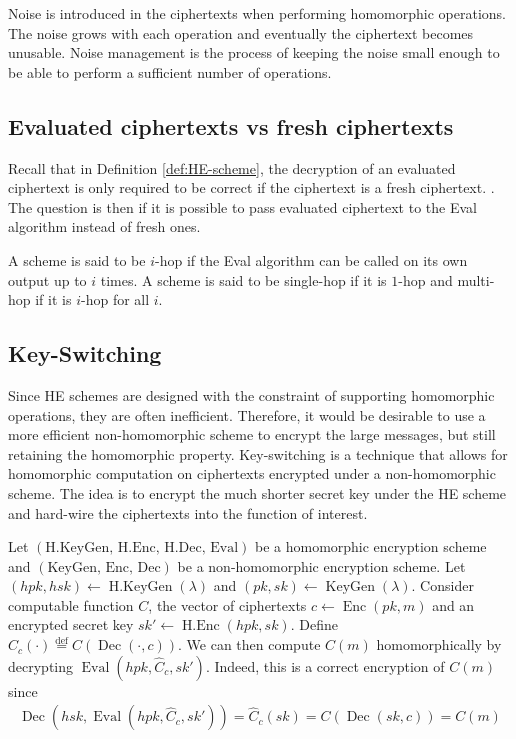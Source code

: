 Noise is introduced in the ciphertexts when performing homomorphic operations. The noise grows with each operation and eventually the ciphertext becomes unusable. Noise management is the process of keeping the noise small enough to be able to perform a sufficient number of operations.

\subsection*{Evaluated ciphertexts vs fresh ciphertexts}
Recall that in Definition \ref{def:HE-scheme}, the decryption of an evaluated ciphertext is only required to be correct if the ciphertext is a fresh ciphertext. . The question is then if it is possible to pass evaluated ciphertext to the Eval algorithm instead of fresh ones.

A scheme is said to be $i$-hop if the Eval algorithm can be called on its own output up to $i$ times. A scheme is said to be single-hop if it is $1$-hop and multi-hop if it is $i$-hop for all $i$. 

\subsection*{Key-Switching}
Since HE schemes are designed with the constraint of supporting homomorphic operations, they are often inefficient. Therefore, it would be desirable to use a more efficient non-homomorphic scheme to encrypt the large messages, but still retaining the homomorphic property. Key-switching is a technique that allows for homomorphic computation on ciphertexts encrypted under a non-homomorphic scheme. The idea is to encrypt the much shorter secret key under the HE scheme and hard-wire the ciphertexts into the function of interest.

Let $(\text{H.KeyGen, H.Enc, H.Dec, Eval})$ be a homomorphic encryption scheme and $(\text{KeyGen, Enc, Dec})$ be a non-homomorphic encryption scheme. Let $(hpk,hsk) \leftarrow \operatorname{H.KeyGen}(\lambda)$ and $(pk,sk) \leftarrow \operatorname{KeyGen}(\lambda)$. Consider computable function $C$, the vector of ciphertexts $c \leftarrow \operatorname{Enc}(pk,m)$ and an encrypted secret key $sk' \leftarrow \operatorname{H.Enc}(hpk,sk)$. Define $\hat{C}_c(\cdot) \stackrel{\mathrm{def}}{=} C(\operatorname{Dec}(\cdot, c))$. We can then compute $C(m)$ homomorphically by decrypting $\operatorname{Eval}(hpk,\hat{C}_c, sk')$. Indeed, this is a correct encryption of $C(m)$ since
\begin{equation*}
    \begin{aligned}
        \operatorname{Dec}(hsk,\operatorname{Eval}(hpk,\hat{C}_c, sk')) = \hat{C}_c(sk) = C(\operatorname{Dec}(sk, c)) = C(m)
    \end{aligned}
\end{equation*}

